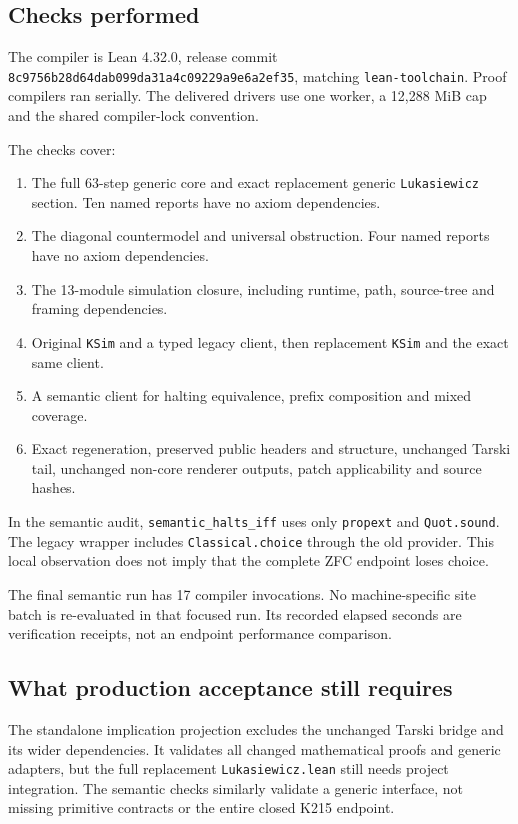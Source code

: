 \documentclass[11pt,letterpaper]{article}
\newcommand{\code}[1]{\texttt{#1}}
\begin{document}
\subsection{Checks performed}

The compiler is Lean 4.32.0, release commit
\code{8c9756b28d64dab099da31a4c09229a9e6a2ef35}, matching \code{lean-toolchain}.
Proof compilers ran serially. The delivered drivers use one worker, a
12,288 MiB cap and the shared compiler-lock convention.

The checks cover:
\begin{enumerate}
\item The full 63-step generic core and exact replacement generic
\code{Lukasiewicz} section. Ten named reports have no axiom dependencies.
\item The diagonal countermodel and universal obstruction. Four named reports
have no axiom dependencies.
\item The 13-module simulation closure, including runtime, path, source-tree
and framing dependencies.
\item Original \code{KSim} and a typed legacy client, then replacement
\code{KSim} and the exact same client.
\item A semantic client for halting equivalence, prefix composition and mixed
coverage.
\item Exact regeneration, preserved public headers and structure, unchanged
Tarski tail, unchanged non-core renderer outputs, patch applicability and
source hashes.
\end{enumerate}

In the semantic audit, \code{semantic\_halts\_iff} uses only
\code{propext} and \code{Quot.sound}. The legacy wrapper includes
\code{Classical.choice} through the old provider. This local observation does
not imply that the complete ZFC endpoint loses choice.

The final semantic run has 17 compiler invocations. No machine-specific site
batch is re-evaluated in that focused run. Its recorded elapsed seconds are
verification receipts, not an endpoint performance comparison.

\subsection{What production acceptance still requires}

The standalone implication projection excludes the unchanged Tarski bridge and
its wider dependencies. It validates all changed mathematical proofs and generic
adapters, but the full replacement \code{Lukasiewicz.lean} still needs project
integration. The semantic checks similarly validate a generic interface,
not missing primitive contracts or the entire closed K215 endpoint.
\end{document}

